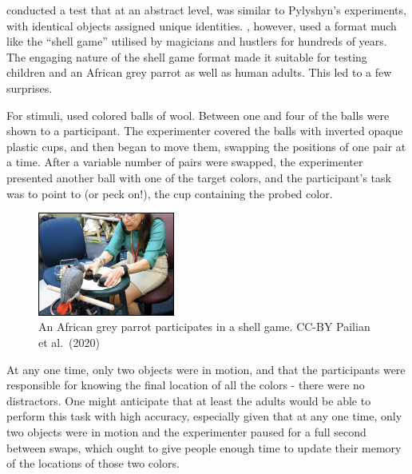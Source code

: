 \documentclass[
]{book}
\begin{document}
\citet{pailianAgeSpeciesComparisons2020} conducted a test that at an abstract level, was similar to Pylyshyn's experiments, with identical objects assigned unique identities. \citet{pailianAgeSpeciesComparisons2020}, however, used a format much like the ``shell game'' utilised by magicians and hustlers for hundreds of years. The engaging nature of the shell game format made it suitable for testing children and an African grey parrot as well as human adults. This led to a few surprises.

For stimuli, \citet{pailianAgeSpeciesComparisons2020} used colored balls of wool. Between one and four of the balls were shown to a participant. The experimenter covered the balls with inverted opaque plastic cups, and then began to move them, swapping the positions of one pair at a time. After a variable number of pairs were swapped, the experimenter presented another ball with one of the target colors, and the participant's task was to point to (or peck on!), the cup containing the probed color.

\begin{figure}
\centering
\includegraphics[width=0.4\textwidth,height=\textheight]{imagesForRmd/ParrotGriffinPepperbergShellGame.png}
\caption{An African grey parrot participates in a shell game. CC-BY Pailian et al.~(2020)}
\end{figure}

At any one time, only two objects were in motion, and that the participants were responsible for knowing the final location of all the colors - there were no distractors. One might anticipate that at least the adults would be able to perform this task with high accuracy, especially given that at any one time, only two objects were in motion and the experimenter paused for a full second between swaps, which ought to give people enough time to update their memory of the locations of those two colors.
\end{document}
